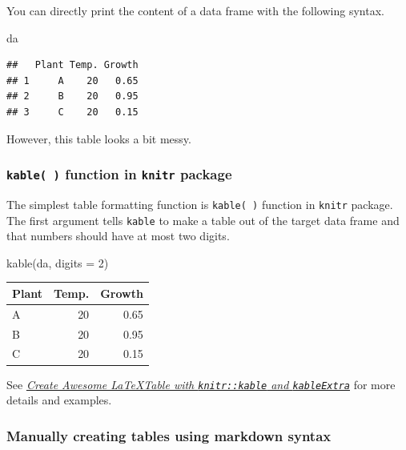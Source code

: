 \documentclass[
  11pt,
]{article}
\newenvironment{Shaded}{\begin{snugshade}}{\end{snugshade}}
\newcommand{\AttributeTok}[1]{\textcolor[rgb]{0.77,0.63,0.00}{#1}}
\newcommand{\DecValTok}[1]{\textcolor[rgb]{0.00,0.00,0.81}{#1}}
\newcommand{\FunctionTok}[1]{\textcolor[rgb]{0.00,0.00,0.00}{#1}}
\newcommand{\NormalTok}[1]{#1}
\begin{document}
You can directly print the content of a data frame with the following
syntax.

\begin{Shaded}
\begin{Highlighting}[]
\NormalTok{da}
\end{Highlighting}
\end{Shaded}

\begin{verbatim}
##   Plant Temp. Growth
## 1     A    20   0.65
## 2     B    20   0.95
## 3     C    20   0.15
\end{verbatim}

However, this table looks a bit messy.

\hypertarget{function-in-package}{%
\subsubsection{\texorpdfstring{\texttt{kable( )} function in
\texttt{knitr}
package}{ function in  package}}\label{function-in-package}}

The simplest table formatting function is \texttt{kable( )} function in
\texttt{knitr} package. The first argument tells \texttt{kable} to make
a table out of the target data frame and that numbers should have at
most two digits.

\begin{Shaded}
\begin{Highlighting}[]
\FunctionTok{kable}\NormalTok{(da, }\AttributeTok{digits =} \DecValTok{2}\NormalTok{)}
\end{Highlighting}
\end{Shaded}

\begin{tabular}{l|r|r}
\hline
Plant & Temp. & Growth\\
\hline
A & 20 & 0.65\\
\hline
B & 20 & 0.95\\
\hline
C & 20 & 0.15\\
\hline
\end{tabular}

See
\href{https://haozhu233.github.io/kableExtra/awesome_table_in_pdf.pdf}{\emph{Create
Awesome \LaTeX Table with \texttt{knitr::kable} and
\texttt{kableExtra}}} for more details and examples.

\hypertarget{manually-creating-tables-using-markdown-syntax}{%
\subsubsection{Manually creating tables using markdown
syntax}\label{manually-creating-tables-using-markdown-syntax}}
\end{document}
